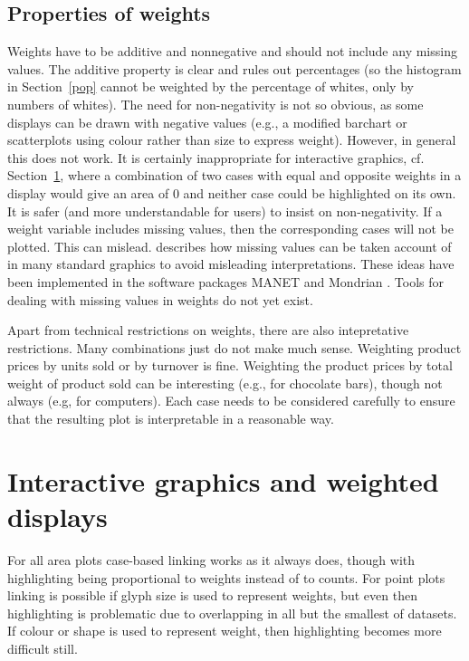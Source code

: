 \documentclass{svmult}
\begin{document}
\subsection{Properties of weights}
\label{props}
Weights have to be additive and nonnegative and should not include any missing values.  The additive property is clear and rules out percentages (so the histogram in Section~\ref{pop} cannot be weighted by the percentage of whites, only by numbers of whites).  The need for non-negativity is not so obvious, as some displays can be drawn with negative values (e.g., a modified barchart or scatterplots using colour rather than size to express weight).  However, in general this does not work.  It is certainly inappropriate for interactive graphics, cf. Section~\ref{ig}, where a combination of two cases with equal and opposite weights in a display would give an area of $0$ and neither case could be highlighted on its own.  It is safer (and more understandable for users) to insist on non-negativity.  If a weight variable includes missing values, then the corresponding cases will not be plotted.  This can mislead.  \cite{unwin:1996} describes how missing values can be taken account of in many standard graphics to avoid misleading interpretations.  These ideas have been implemented in the software packages MANET \citep{hofmann:2000a} and Mondrian \citep{theus:2002}.  Tools for dealing with missing values in weights do not yet exist.

Apart from technical restrictions on weights, there are also intepretative restrictions.  Many combinations just do not make much sense.   Weighting product prices by units sold or by turnover is fine.  Weighting the product prices by total weight of product sold can be interesting (e.g., for chocolate bars), though not always (e.g, for computers).  Each case needs to be considered carefully to ensure that the resulting plot is interpretable in a reasonable way.

\section{Interactive graphics and weighted displays}
\label{ig}
For all area plots case-based linking works as it always does, though with highlighting being proportional to weights instead of to counts.  For point plots linking is possible if glyph size is used to represent weights, but even then highlighting is problematic due to overlapping in all but the smallest of datasets.  If colour or shape is used to represent weight, then highlighting becomes more difficult still.
\end{document}
